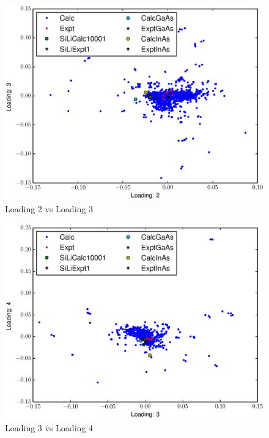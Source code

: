\documentclass[12pt,letterpaper]{article}
\begin{document}
\begin{figure}[ht]
  \begin{center}
    \includegraphics[scale=0.8]{figs/eigenspace2-3.eps}
    \caption{Loading 2 vs  Loading 3}
  \end{center}
\end{figure}

\begin{figure}[ht]
  \begin{center}
    \includegraphics[scale=0.8]{figs/eigenspace3-4.eps}
    \caption{Loading 3 vs  Loading 4}
  \end{center}
\end{figure}
\end{document}
